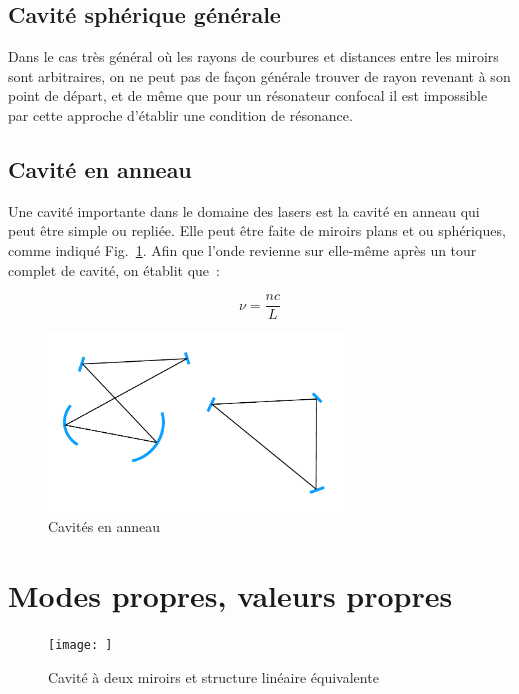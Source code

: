 \documentclass[a4paper]{book}
\begin{document}
\subsection{Cavité sphérique générale}
Dans le cas très général où les rayons de courbures et distances entre les miroirs sont arbitraires, on ne peut pas de façon générale trouver de rayon revenant à son point de départ, et de même que pour un résonateur confocal il est impossible par cette approche d'établir une condition de résonance. 

\subsection{Cavité en anneau}
Une cavité importante dans le domaine des lasers est la cavité en anneau qui peut être simple ou repliée. Elle peut être faite de miroirs plans et ou sphériques, comme indiqué Fig.~\ref{fig:ring_cavity}. Afin que l'onde revienne sur elle-même après un tour complet de cavité, on établit que~:

\begin{equation}
    \nu=\frac{nc}{L}
\end{equation}

\begin{figure}[!htbp]
\begin{center}
\includegraphics[width=8cm]{pictures/RingCav.png}
\end{center}
\caption{Cavités en anneau}
\label{fig:ring_cavity}
\end{figure}

\section{Modes propres, valeurs propres}


\begin{figure}[!htbp]
\begin{center}
\texttt{[image: ]}
\end{center}
\caption{Cavité à deux miroirs et structure linéaire équivalente}
\label{fig:eigenmodes_cavity}
\end{figure}
\end{document}
